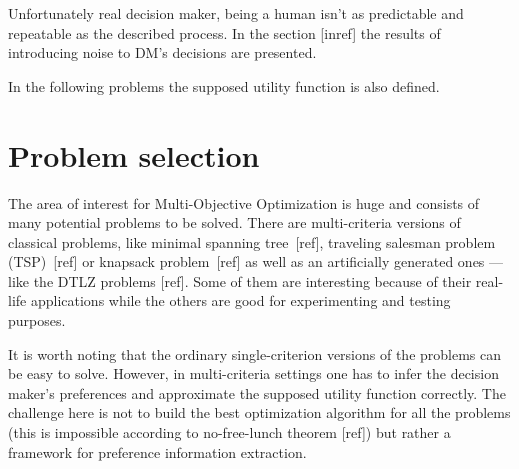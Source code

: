 Unfortunately real decision maker, being a human isn't as predictable and
repeatable as the described process. In the section [inref] the results of
introducing noise to DM's decisions are presented.

In the following problems the supposed utility function is also defined.

\section{Problem selection}

The area of interest for Multi-Objective Optimization is huge and consists of
many potential problems to be solved. There are multi-criteria versions of
classical problems, like minimal spanning tree~[ref], traveling salesman
problem (TSP)~[ref] or knapsack problem~[ref] as well as an artificially
generated ones --- like the DTLZ problems [ref]. Some of them are interesting
because of their real-life applications while the others are good for
experimenting and testing purposes.

It is worth noting that the ordinary single-criterion versions of the problems
can be easy to solve. However, in multi-criteria settings one has to infer the
decision maker's preferences and approximate the supposed utility function
correctly. The challenge here is not to build the best optimization algorithm
for all the problems (this is impossible according to no-free-lunch theorem
[ref]) but rather a framework for preference information extraction.

